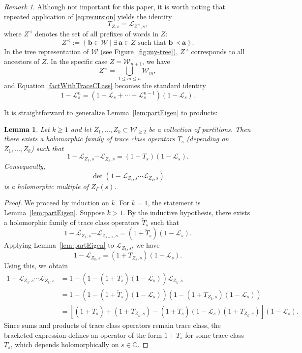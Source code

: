 \documentclass[12pt,letterpaper]{amsart}
\theoremstyle{plain}
\newtheorem{lemma}[prop]{Lemma}
\theoremstyle{definition}
\theoremstyle{remark}
\newtheorem{remark}[prop]{Remark}
\newcommand{\CC}{\mathbb{C}}
\begin{document}
\begin{remark}
Although not important for this paper, it is worth noting that repeated application of \eqref{eq:recursion} yields the identity
\[
T_{Z,s} = \mathcal{L}_{Z^\prec,s},
\]
where $Z^\prec$ denotes the set of all prefixes of words in $Z$:
\[
Z^\prec := \left\{ \textbf{b} \in \mathcal{W} \mid \exists\, \textbf{a} \in Z \text{ such that } \textbf{b} \prec \textbf{a} \right\}.
\]
In the tree representation of $\mathcal{W}$ (see Figure~\ref{fig:my-tree}), $Z^\prec$ corresponds to all ancestors of $Z$. In the specific case $Z = \mathcal{W}_{n+1}$, we have
\[
Z^\prec = \bigcup_{1 \le m \le n} \mathcal{W}_m,
\]
and Equation \eqref{factWithTraceCLass} becomes the standard identity
\[
1 - \mathcal{L}_s^n = (1 + \mathcal{L}_s + \cdots + \mathcal{L}_s^{n-1})(1 - \mathcal{L}_s).
\]
\end{remark}

It is straightforward to generalize Lemma~\ref{lem:partEigen} to products:


\begin{lemma}\label{lem:holomMultiple}
Let $k \ge 1$ and let $Z_1, \dots, Z_k \subset \mathcal{W}_{\ge 2}$ be a collection of partitions. Then there exists a holomorphic family of trace class operators $T_s$ (depending on $Z_1, \dots, Z_k$) such that
\[
1 - \mathcal{L}_{Z_1,s} \cdots \mathcal{L}_{Z_k,s} = (1 + T_s)(1 - \mathcal{L}_s).
\]
Consequently,
\[
\det\left(1 - \mathcal{L}_{Z_1,s} \cdots \mathcal{L}_{Z_k,s}\right)
\]
is a holomorphic multiple of $Z_\Gamma(s)$.
\end{lemma}

\begin{proof}
We proceed by induction on $k$. For $k = 1$, the statement is Lemma~\ref{lem:partEigen}. Suppose $k > 1$. By the inductive hypothesis, there exists a holomorphic family of trace class operators $\widetilde{T}_s$ such that
\[
1 - \mathcal{L}_{Z_1,s} \cdots \mathcal{L}_{Z_{k-1},s} = (1 + \widetilde{T}_s)(1 - \mathcal{L}_s).
\]
Applying Lemma~\ref{lem:partEigen} to $\mathcal{L}_{Z_k,s}$, we have
\[
1 - \mathcal{L}_{Z_k,s} = (1 + T_{Z_k,s})(1 - \mathcal{L}_s).
\]
Using this, we obtain
\begin{align*}
1 - \mathcal{L}_{Z_1,s} \cdots \mathcal{L}_{Z_k,s}
&= 1 - \left(1 - (1 + \widetilde{T}_s)(1 - \mathcal{L}_s)\right) \mathcal{L}_{Z_k,s} \\
&= 1 - \left(1 - (1 + \widetilde{T}_s)(1 - \mathcal{L}_s)\right) \left(1 - (1 + T_{Z_k,s})(1 - \mathcal{L}_s)\right) \\
&= \left[(1 + \widetilde{T}_s) + (1 + T_{Z_k,s}) - (1 + \widetilde{T}_s)(1 - \mathcal{L}_s)(1 + T_{Z_k,s})\right](1 - \mathcal{L}_s).
\end{align*}
Since sums and products of trace class operators remain trace class, the bracketed expression defines an operator of the form $1 + T_s$ for some trace class $T_s$, which depends holomorphically on $s \in \CC$.
\end{proof}
\end{document}
